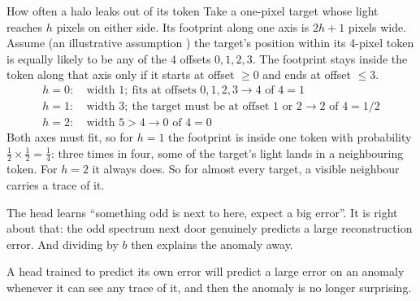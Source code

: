 \begin{worked}[label={we:uncertainty:halo}]{How often a halo leaks out of its token}
Take a one-pixel target whose light reaches $h$ pixels on either side. Its footprint along one axis is
$2h+1$ pixels wide. Assume (an illustrative assumption \tagA) the target's position within its 4-pixel token is
equally likely to be any of the 4 offsets $0,1,2,3$. The footprint stays inside the token along that axis only
if it starts at offset $\ge 0$ and ends at offset $\le 3$.
\begin{align*}
h=0:&\ \text{width }1;\ \text{fits at offsets }0,1,2,3 \to 4\text{ of }4 = 1\\
h=1:&\ \text{width }3;\ \text{the target must be at offset 1 or 2} \to 2\text{ of }4 = 1/2\\
h=2:&\ \text{width }5 > 4 \to 0\text{ of }4 = 0
\end{align*}
Both axes must fit, so for $h=1$ the footprint is inside one token with probability
$\tfrac12\times\tfrac12=\tfrac14$: three times in four, some of the target's light lands in a neighbouring
token. For $h=2$ it always does. So for almost every target, a visible neighbour carries a trace of it.
\end{worked}

The head learns ``something odd is next to here, expect a big error''. It is right about that: the odd
spectrum next door genuinely predicts a large reconstruction error. And dividing by $b$ then explains the
anomaly away.

\begin{keypoint}
A head trained to predict its own error will predict a large error on an anomaly whenever it can see any
trace of it, and then the anomaly is no longer surprising.
\end{keypoint}

